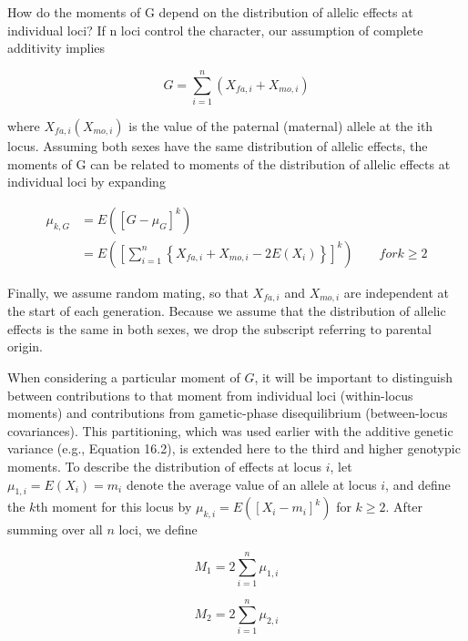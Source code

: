 \documentclass{article}
\begin{document}
How do the moments of G depend on the distribution of allelic effects at individual loci? If n loci control the character, our assumption of complete additivity implies

\begin{equation}
G=\sum_{i=1}^{n}\left(X_{fa,i}+X_{mo,i}\right)
\tag{24.16}
\label{eq:24_16}
\end{equation}

where  $ X_{fa,i}\left(X_{mo,i}\right) $ is the value of the paternal (maternal) allele at the ith locus. Assuming both sexes have the same distribution of allelic effects, the moments of G can be related to moments of the distribution of allelic effects at individual loci by expanding

\begin{equation}
\begin{aligned}\mu_{k,G}&=E\left(\left[G-\mu_{G}\right]^{k}\right)\\&=E\left(\left[\sum_{i=1}^{n}\left\{X_{fa,i}+X_{mo,i}-2E(X_{i})\right\}\right]^{k}\right)\qquad for k\geq2\end{aligned}
\tag{24.17}
\label{eq:24_17}
\end{equation}

Finally, we assume random mating, so that  $ X_{fa,i} $ and  $ X_{mo,i} $ are independent at the start of each generation. Because we assume that the distribution of allelic effects is the same in both sexes, we drop the subscript referring to parental origin.

When considering a particular moment of $G$, it will be important to distinguish between contributions to that moment from individual loci (within-locus moments) and contributions from gametic-phase disequilibrium (between-locus covariances). This partitioning, which was used earlier with the additive genetic variance (e.g., Equation 16.2), is extended here to the third and higher genotypic moments. To describe the distribution of effects at locus $i$, let $\mu_{1,i} = E(X_i) = m_i$ denote the average value of an allele at locus $i$, and define the $k$th moment for this locus by $\mu_{k,i} = E([X_i - m_i]^k)$ for $k \geq 2$. After summing over all $n$ loci, we define

\begin{equation}
M_{1}=2\sum_{i=1}^{n}\mu_{1,i}
\tag{24.18a}
\label{eq:24_18a}
\end{equation}

\begin{equation}
M_{2}=2\sum_{i=1}^{n}\mu_{2,i}
\tag{24.18b}
\label{eq:24_18b}
\end{equation}
\end{document}
